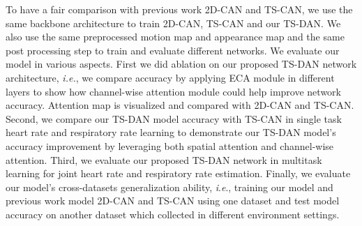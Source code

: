 \documentclass[conference]{IEEEtran}
\newcommand{\ie}{\textit{i}.\textit{e}.}
\begin{document}
To have a fair comparison with previous work 2D-CAN \cite{chen2018deepphys} and TS-CAN\cite{liu2020multi}, we use the same backbone architecture to train 2D-CAN, TS-CAN and our TS-DAN. We also use the same preprocessed motion map and appearance map and the same post processing step to train and evaluate different networks. We evaluate our model in various aspects. First we did ablation on our proposed TS-DAN network architecture, \textit{i.e.}, we compare accuracy by applying ECA \cite{wang2020eca} module in different layers to show how channel-wise attention module could help improve network accuracy. Attention map is visualized and compared with 2D-CAN and TS-CAN. Second, we compare our TS-DAN model accuracy with TS-CAN in single task heart rate and respiratory rate learning to demonstrate our TS-DAN model's accuracy improvement by leveraging both spatial attention and channel-wise attention. Third, we evaluate our proposed TS-DAN network in multitask learning for joint heart rate and respiratory rate estimation. Finally, we evaluate our model's cross-datasets generalization ability, \ie, training our model and previous work model 2D-CAN and TS-CAN using one dataset and test model accuracy on another dataset which collected in different environment settings.
\end{document}
